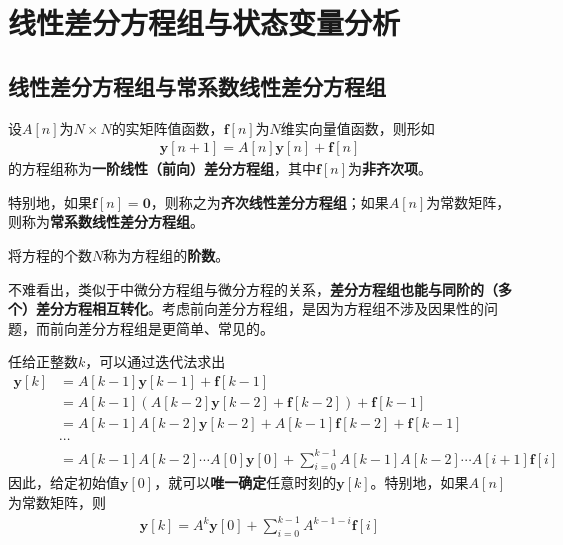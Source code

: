 \section{线性差分方程组与状态变量分析}\label{sec:Difference_Equation}

\subsection{线性差分方程组与常系数线性差分方程组}\label{sub:linear_difference_equation}

\begin{definition}[一阶线性差分方程组]
    设$A[n]$为$N\times N$的实矩阵值函数，$\mathbf{f}[n]$为$N$维实向量值函数，则形如
    \begin{align*}
        \mathbf{y}[n+1] = A[n] \mathbf{y}[n] + \mathbf{f}[n]
    \end{align*}
    的方程组称为\textbf{一阶线性（前向）差分方程组}，其中$\mathbf{f}[n]$为\textbf{非齐次项}。

    特别地，如果$\mathbf{f}[n]=\mathbf{0}$，则称之为\textbf{齐次线性差分方程组}；如果$A[n]$为常数矩阵，则称为\textbf{常系数线性差分方程组}。

    将方程的个数$N$称为方程组的\textbf{阶数}。
\end{definition}

不难看出，类似于中微分方程组与微分方程的关系，\textbf{差分方程组也能与同阶的（多个）差分方程相互转化}。考虑前向差分方程组，是因为方程组不涉及因果性的问题，而前向差分方程组是更简单、常见的。

任给正整数$k$，可以通过迭代法求出\begin{align*}
    \mathbf{y}[k] &= A[k-1] \mathbf{y}[k-1] + \mathbf{f}[k-1]\\
    & = A[k-1] (A[k-2] \mathbf{y}[k-2] + \mathbf{f}[k-2]) + \mathbf{f}[k-1]\\
    & = A[k-1] A[k-2] \mathbf{y}[k-2] + A[k-1] \mathbf{f}[k-2] + \mathbf{f}[k-1]\\
    & \cdots\\
    & = A[k-1] A[k-2] \cdots A[0] \mathbf{y}[0] + \sum_{i=0}^{k-1} A[k-1] A[k-2] \cdots A[i+1] \mathbf{f}[i]
\end{align*}
因此，给定初始值$\mathbf{y}[0]$，就可以\textbf{唯一确定}任意时刻的$\mathbf{y}[k]$。特别地，如果$A[n]$为常数矩阵，则\begin{align*}
    \mathbf{y}[k] = A^k \mathbf{y}[0] + \sum_{i=0}^{k-1} A^{k-1-i} \mathbf{f}[i]
\end{align*}

